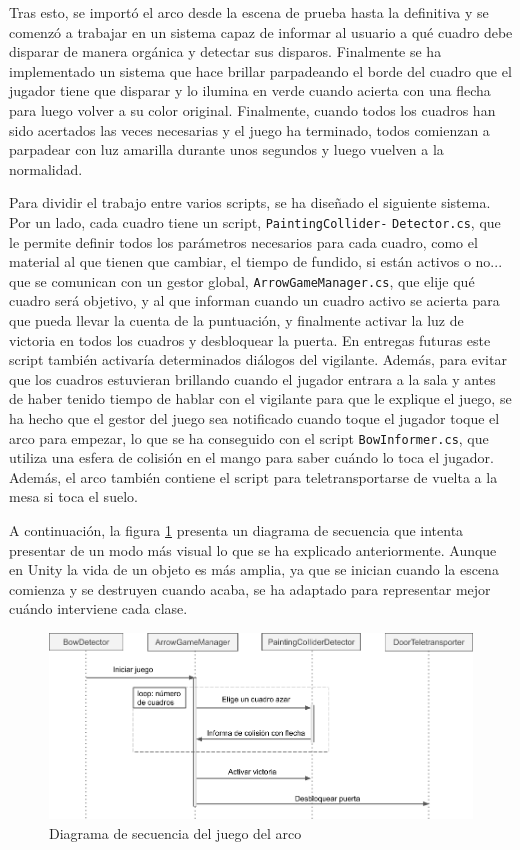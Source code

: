 Tras esto, se importó el arco desde la escena de prueba hasta la definitiva y se comenzó a trabajar en un sistema capaz de informar al usuario a qué cuadro debe disparar de manera orgánica y detectar sus disparos. Finalmente se ha implementado un sistema que hace brillar parpadeando el borde del cuadro que el jugador tiene que disparar y lo ilumina en verde cuando acierta con una flecha para luego volver a su color original. Finalmente, cuando todos los cuadros han sido acertados las veces necesarias y el juego ha terminado, todos comienzan a parpadear con luz amarilla durante unos segundos y luego vuelven a la normalidad.

Para dividir el trabajo entre varios scripts, se ha diseñado el siguiente sistema. Por un lado, cada cuadro tiene un script, \texttt{PaintingCollider-} \texttt{Detector.cs}, que le permite definir todos los parámetros necesarios para cada cuadro, como el material al que tienen que cambiar, el tiempo de fundido, si están activos o no... que se comunican con un gestor global, \texttt{ArrowGameManager.cs}, que elije qué cuadro será objetivo, y al que informan cuando un cuadro activo se acierta para que pueda llevar la cuenta de la puntuación, y finalmente activar la luz de victoria en todos los cuadros y desbloquear la puerta. En entregas futuras este script también activaría determinados diálogos del vigilante. Además, para evitar que los cuadros estuvieran brillando cuando el jugador entrara a la sala y antes de haber tenido tiempo de hablar con el vigilante para que le explique el juego, se ha hecho que el gestor del juego sea notificado cuando toque el jugador toque el arco para empezar, lo que se ha conseguido con el script \texttt{BowInformer.cs}, que utiliza una esfera de colisión en el mango para saber cuándo lo toca el jugador. Además, el arco también contiene el script para teletransportarse de vuelta a la mesa si toca el suelo.

A continuación, la figura \ref{fig:sequence-diagram-bow} presenta un diagrama de secuencia que intenta presentar de un modo más visual lo que se ha explicado anteriormente. Aunque en Unity la vida de un objeto es más amplia, ya que se inician cuando la escena comienza y se destruyen cuando acaba, se ha adaptado para representar mejor cuándo interviene cada clase.

\begin{figure}[!h]
\begin{center}
\includegraphics[width=1\textwidth]{imagenes/7/bow-sequence-diagram.png}
\caption{Diagrama de secuencia del juego del arco}
\label{fig:sequence-diagram-bow}
\end{center}
\end{figure}

